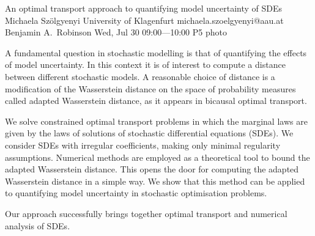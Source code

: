 \clearpage
\begin{talk}
  {An optimal transport approach to quantifying model uncertainty of SDEs}%
  {Michaela Sz\"olgyenyi}%
  {University of Klagenfurt}%
  {michaela.szoelgyenyi@aau.at}%
  {Benjamin A.~Robinson}%
  {}%
  {Wed, Jul 30 09:00---10:00}%
  {P5}%
  {photo}%
  
    
   
A fundamental question in stochastic modelling is that of quantifying the effects of model uncertainty. In this context it is of interest to compute a distance between different stochastic models. A  reasonable choice of distance is a modification of the Wasserstein distance on the space of probability measures called adapted Wasserstein distance, as it appears in bicausal optimal transport.

 We solve constrained optimal transport problems in which the marginal laws are given by the laws of solutions of stochastic differential equations (SDEs). We consider SDEs with irregular coefficients, making only minimal regularity assumptions. Numerical methods are employed as a theoretical tool to bound the adapted Wasserstein distance. This opens the door for computing the adapted Wasserstein distance in a simple way. We show that this method can be applied to quantifying model uncertainty in stochastic optimisation problems.  
 
 Our approach successfully brings together optimal transport and numerical analysis of SDEs. 
\end{talk}

